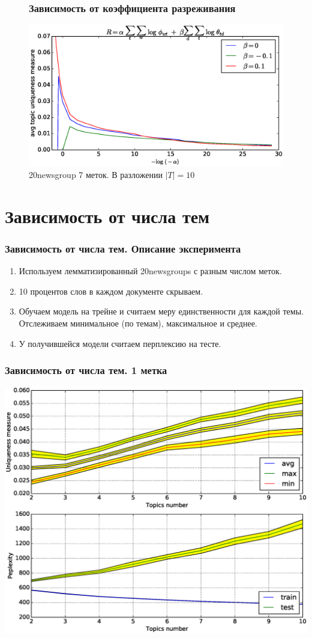 \documentclass[utf8]{beamer}
\begin{document}
	\begin{frame}	
	\begin{figure}[h]
	\frametitle{Зависимость от коэффициента разреживания}
	\centering  	
	\caption{20newsgroup 7 меток. В разложении $|T| = 10$} 
	\medskip
	\includegraphics[width=0.9\linewidth]{presentation_pictures/alpha_dependency_topics_origin_7_ums.eps}  
	\end{figure}
	\end{frame}
	
	\section{Зависимость от числа тем}
	\begin{frame}	
	\frametitle{Зависимость от числа тем. Описание эксперимента}
	\begin{enumerate}
\item Используем лемматизированный 20newsgroups с разным числом меток.
\item 10 процентов слов в каждом документе скрываем.
\item Обучаем модель на трейне и считаем меру единственности для каждой темы. Отслеживаем минимальное (по темам), максимальное и среднее.
\item У получившейся модели считаем перплексию на тесте.
\end{enumerate}
	\end{frame}
	
	\begin{frame}	
	\frametitle{Зависимость от числа тем. 1 метка}
	\includegraphics[width=0.75\linewidth]{presentation_pictures/topics_dependency_origin_1_ums.eps} 
	\end{frame}
	
\end{document}
